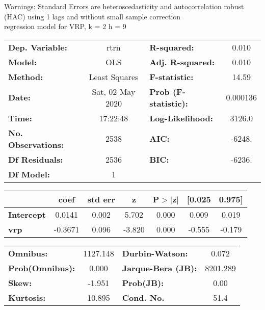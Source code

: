 Warnings: \newline
 [1] Standard Errors are heteroscedasticity and autocorrelation robust (HAC) using 1 lags and without small sample correction\\ 

regression model for VRP, k = 2 h = 9\begin{center}
\begin{tabular}{lclc}
\toprule
\textbf{Dep. Variable:}    &       rtrn       & \textbf{  R-squared:         } &     0.010   \\
\textbf{Model:}            &       OLS        & \textbf{  Adj. R-squared:    } &     0.010   \\
\textbf{Method:}           &  Least Squares   & \textbf{  F-statistic:       } &     14.59   \\
\textbf{Date:}             & Sat, 02 May 2020 & \textbf{  Prob (F-statistic):} &  0.000136   \\
\textbf{Time:}             &     17:22:48     & \textbf{  Log-Likelihood:    } &    3126.0   \\
\textbf{No. Observations:} &        2538      & \textbf{  AIC:               } &    -6248.   \\
\textbf{Df Residuals:}     &        2536      & \textbf{  BIC:               } &    -6236.   \\
\textbf{Df Model:}         &           1      & \textbf{                     } &             \\
\bottomrule
\end{tabular}
\begin{tabular}{lcccccc}
                   & \textbf{coef} & \textbf{std err} & \textbf{z} & \textbf{P$> |$z$|$} & \textbf{[0.025} & \textbf{0.975]}  \\
\midrule
\textbf{Intercept} &       0.0141  &        0.002     &     5.702  &         0.000        &        0.009    &        0.019     \\
\textbf{vrp}       &      -0.3671  &        0.096     &    -3.820  &         0.000        &       -0.555    &       -0.179     \\
\bottomrule
\end{tabular}
\begin{tabular}{lclc}
\textbf{Omnibus:}       & 1127.148 & \textbf{  Durbin-Watson:     } &    0.072  \\
\textbf{Prob(Omnibus):} &   0.000  & \textbf{  Jarque-Bera (JB):  } & 8201.289  \\
\textbf{Skew:}          &  -1.951  & \textbf{  Prob(JB):          } &     0.00  \\
\textbf{Kurtosis:}      &  10.895  & \textbf{  Cond. No.          } &     51.4  \\
\bottomrule
\end{tabular}
\end{center}

